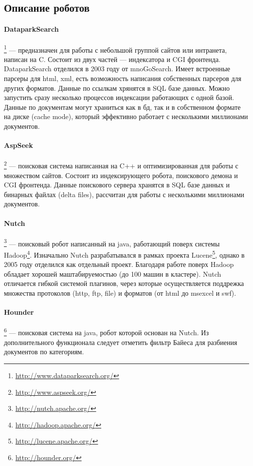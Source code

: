 \subsection{Описание роботов}
\paragraph{DataparkSearch}\footnote{\href{http://www.dataparksearch.org/}{http://www.dataparksearch.org/}} --- предназначен для работы с небольшой группой сайтов или интранета, написан на C. Состоит из двух частей --- индексатора и CGI фронтенда. DataparkSearch отделился в 2003 году от mnoGoSearch. Имеет встроенные парсеры для html, xml, есть возможность написания собственных парсеров для других форматов. Данные по ссылкам хрянятся в SQL базе данных. Можно запустить сразу несколько процессов индексации работающих с одной базой. Данные по документам могут храниться как в бд, так и в собственном формате на диске (cache mode), который эффективно работает с несколькими миллионами документов.
\paragraph{AspSeek}\footnote{\href{http://www.aspseek.org/}{http://www.aspseek.org/}} --- поисковая система написанная на C++ и оптимизированная для работы с множеством сайтов. Состоит из индексирующего робота, поискового демона и CGI фронтенда. Данные поискового сервера хранятся в SQL базе данных и бинарных файлах (delta files), рассчитан для работы с несколькими миллионами документов.
\paragraph{Nutch}\footnote{\href{http://nutch.apache.org/}{http://nutch.apache.org/}} --- поисковый робот написанный на java, работающий поверх системы Hadoop\footnote{\href{http://hadoop.apache.org/}{http://hadoop.apache.org/}}. Изначально Nutch разрабатывался в рамках проекта Lucene\footnote{\href{http://lucene.apache.org/}{http://lucene.apache.org/}}, однако в 2005 году отделился как отдельный проект. Благодаря работе поверх Hadoop обладает хорошей маштабируемостью (до 100 машин в кластере). Nutch отличается гибкой системой плагинов, через которые осуществляется поддрежка множества протоколов (http, ftp, file) и форматов (от html до msexcel и swf).
\paragraph{Hounder}\footnote{\href{http://hounder.org/}{http://hounder.org/}} --- поисковая система на java, робот которой основан на Nutch. Из дополнительного функционала следует отметить фильтр Байеса для разбиения документов по категориям.

